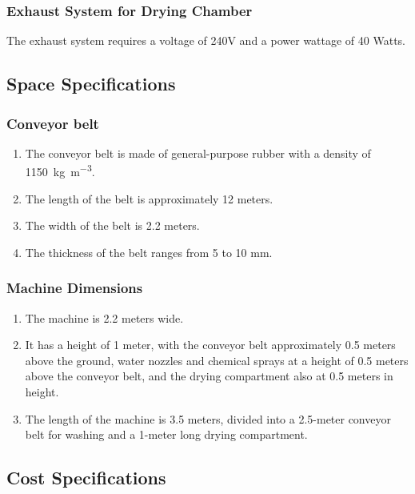 \documentclass[12pt]{article} %
\begin{document}
\subsubsection{Exhaust System for Drying Chamber} 
The exhaust system requires a voltage of 240V and a power wattage of 40 Watts.

\clearpage
\subsection{Space Specifications}

   \subsubsection{Conveyor belt} 
   \begin{enumerate}
   \item The conveyor belt is made of general-purpose rubber with a density of \SI{1150}{\kg\per\cubic\m}.
   \item The length of the belt is approximately 12 meters.
   \item The width of the belt is 2.2 meters.
   \item The thickness of the belt ranges from 5 to 10 mm.
   \end{enumerate}

\subsubsection{Machine Dimensions} 
    \begin{enumerate}
        \item The machine is 2.2 meters wide.
        \item It has a height of 1 meter, with the conveyor belt approximately 0.5 meters above the ground, water nozzles and chemical sprays at a height of 0.5 meters above the conveyor belt, and the drying compartment also at 0.5 meters in height.
        \item The length of the machine is 3.5 meters, divided into a 2.5-meter conveyor belt for washing and a 1-meter long drying compartment.
    \end{enumerate}

\hspace{1cm}
\subsection{Cost Specifications}
\end{document}
